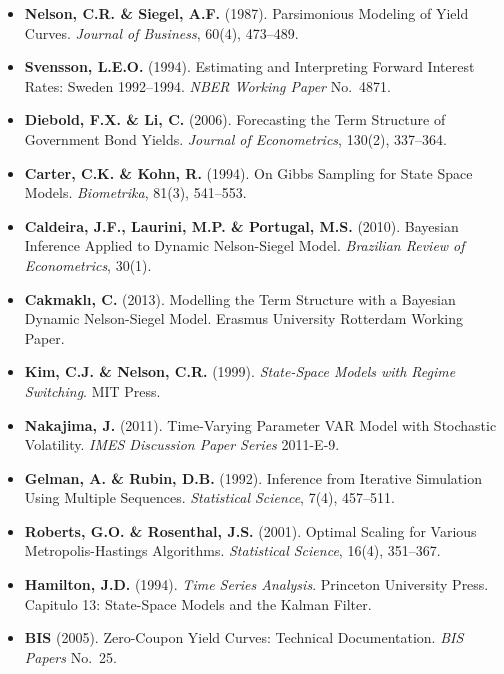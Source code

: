 \documentclass[12pt, a4paper]{article}
\theoremstyle{plain}
\theoremstyle{definition}
\theoremstyle{remark}
\begin{document}
\begin{itemize}[leftmargin=1.5em, itemsep=4pt]

\item \textbf{Nelson, C.R. \& Siegel, A.F.} (1987).
  Parsimonious Modeling of Yield Curves.
  \textit{Journal of Business}, 60(4), 473--489.

\item \textbf{Svensson, L.E.O.} (1994).
  Estimating and Interpreting Forward Interest Rates: Sweden 1992--1994.
  \textit{NBER Working Paper} No.\ 4871.

\item \textbf{Diebold, F.X. \& Li, C.} (2006).
  Forecasting the Term Structure of Government Bond Yields.
  \textit{Journal of Econometrics}, 130(2), 337--364.

\item \textbf{Carter, C.K. \& Kohn, R.} (1994).
  On Gibbs Sampling for State Space Models.
  \textit{Biometrika}, 81(3), 541--553.

\item \textbf{Caldeira, J.F., Laurini, M.P. \& Portugal, M.S.} (2010).
  Bayesian Inference Applied to Dynamic Nelson-Siegel Model.
  \textit{Brazilian Review of Econometrics}, 30(1).

\item \textbf{Cakmaklı, C.} (2013).
  Modelling the Term Structure with a Bayesian Dynamic Nelson-Siegel Model.
  Erasmus University Rotterdam Working Paper.

\item \textbf{Kim, C.J. \& Nelson, C.R.} (1999).
  \textit{State-Space Models with Regime Switching}.
  MIT Press.

\item \textbf{Nakajima, J.} (2011).
  Time-Varying Parameter VAR Model with Stochastic Volatility.
  \textit{IMES Discussion Paper Series} 2011-E-9.

\item \textbf{Gelman, A. \& Rubin, D.B.} (1992).
  Inference from Iterative Simulation Using Multiple Sequences.
  \textit{Statistical Science}, 7(4), 457--511.

\item \textbf{Roberts, G.O. \& Rosenthal, J.S.} (2001).
  Optimal Scaling for Various Metropolis-Hastings Algorithms.
  \textit{Statistical Science}, 16(4), 351--367.

\item \textbf{Hamilton, J.D.} (1994).
  \textit{Time Series Analysis}. Princeton University Press.
  Capitulo 13: State-Space Models and the Kalman Filter.

\item \textbf{BIS} (2005).
  Zero-Coupon Yield Curves: Technical Documentation.
  \textit{BIS Papers} No.\ 25.

\end{itemize}
\end{document}
